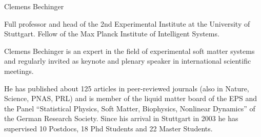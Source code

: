 \begin{participant}[type=PI,PM=12,gender=male,salary=5500]{Clemens Bechinger}

Full professor and head of the 2nd Experimental Institute at the University
of Stuttgart. Fellow of the Max Planck Institute of Intelligent Systems.

%

Clemens Bechinger is an expert in the field of experimental soft matter
systems and regularly invited as keynote and plenary speaker in
international scientific meetings.

%

He has published about 125 articles in peer-reviewed journals (also in
Nature, Science, PNAS, PRL) and is member of the liquid matter board of the
EPS and the Panel ``Statistical Physics, Soft Matter, Biophysics, Nonlinear
Dynamics'' of the German Research Society. Since his arrival in Stuttgart in
2003 he has supervised 10 Postdocs, 18 Phd Students and 22 Master Students.

\end{participant}